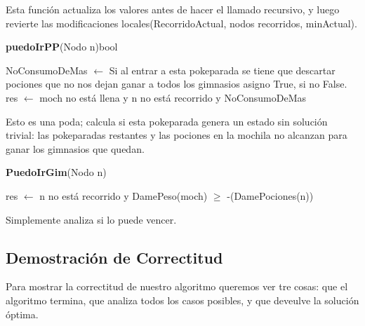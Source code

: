\documentclass[spanish,12pt]{article}
\begin{document}
Esta función actualiza los valores antes de hacer el llamado recursivo, y luego revierte las modificaciones locales(RecorridoActual, nodos recorridos, minActual).


\begin{algorithm}[H]{\textbf{puedoIrPP}(Nodo n){bool}}
	\begin{algorithmic}[1]
	\State NoConsumoDeMas $\gets$ Si al entrar a esta pokeparada se tiene que descartar pociones que no nos dejan ganar a todos los gimnasios asigno True, si no False.
	\State  res $\gets$  moch no está llena y n no está recorrido y NoConsumoDeMas
	\end{algorithmic}
\end{algorithm}
Esto es una poda; calcula si esta pokeparada genera un estado sin solución trivial: las pokeparadas restantes y las pociones en la mochila no alcanzan para ganar los gimnasios que quedan.

\begin{algorithm}[H]{\textbf{PuedoIrGim}(Nodo n)}
	\begin{algorithmic}[1]
		\state res $\gets$  n no está recorrido y DamePeso(moch) $\geq$ -(DamePociones(n))
	\end{algorithmic}
\end{algorithm}

Simplemente analiza si lo puede vencer.

\subsection{Demostración de Correctitud}

Para mostrar la correctitud de nuestro algoritmo queremos ver tre cosas: que el algoritmo termina, que analiza todos los casos posibles, y que deveulve la solución óptima.
\end{document}
